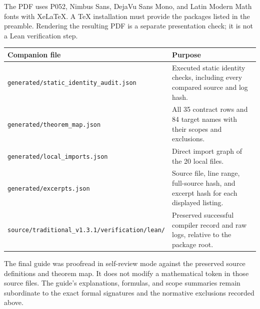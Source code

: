 \documentclass[11pt,a4paper]{article}
\newcommand{\code}[1]{\nolinkurl{#1}}
\begin{document}
The PDF uses P052, Nimbus Sans, DejaVu Sans Mono, and Latin Modern Math fonts with XeLaTeX. A TeX installation must provide the packages listed in the preamble. Rendering the resulting PDF is a separate presentation check; it is not a Lean verification step.

\begin{longtable}{p{}p{}}
\toprule Companion file & Purpose \\\midrule\endhead
\code{generated/static_identity_audit.json} & Executed static identity checks, including every compared source and log hash. \\
\code{generated/theorem_map.json} & All 35 contract rows and 84 target names with their scopes and exclusions. \\
\code{generated/local_imports.json} & Direct import graph of the 20 local files. \\
\code{generated/excerpts.json} & Source file, line range, full-source hash, and excerpt hash for each displayed listing. \\
\code{source/traditional_v1.3.1/verification/lean/} & Preserved successful compiler record and raw logs, relative to the package root. \\
\bottomrule
\end{longtable}

The final guide was proofread in self-review mode against the preserved source definitions and theorem map. It does not modify a mathematical token in those source files. The guide's explanations, formulas, and scope summaries remain subordinate to the exact formal signatures and the normative exclusions recorded above.
\end{document}
